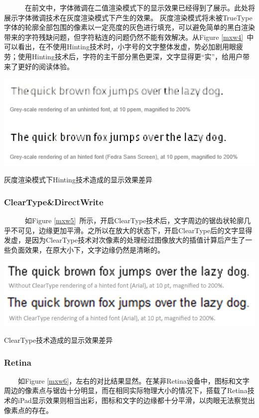 \documentclass[a4paper]{article}
\begin{document}
~~~~~~在前文中，字体微调在二值渲染模式下的显示效果已经得到了展示。此处将展示字体微调技术在灰度渲染模式下产生的效果。
灰度渲染模式将未被TrueType字体的轮廓全部包围的像素以一定亮度的灰色进行填充，可以避免简单的黑白渲染带来的字符残缺问题，但字符粘连的问题仍然不能有效解决。从Figure \ref{mxw4}~中可以看出，在不使用Hinting技术时，小字号的文字整体发虚，势必加剧用眼疲劳；使用Hinting技术后，字符的主干部分黑色更深，文字显得更“实”，给用户带来了更好的阅读体验。

\makeatletter
\def\@captype{figure}
\makeatother
\centerline{\includegraphics [width=1\textwidth]{mxw4.png} }
\caption{灰度渲染模式下Hinting技术造成的显示效果差异}
\label{mxw4}

\subsubsection{ClearType\&DirectWrite}

~~~~~~如Figure \ref{mxw5}~所示，开启ClearType技术后，文字周边的锯齿状轮廓几乎不可见，边缘更加平滑。之所以在放大的状态下，开启ClearType后的文字显得发虚，是因为ClearType技术对次像素的处理经过图像放大的插值计算后产生了一些负面效果，在原大小下，文字边缘仍然是清晰的。

\makeatletter
\def\@captype{figure}
\makeatother
\centerline{\includegraphics [width=1\textwidth]{mxw5.png} }
\caption{ ClearType技术造成的显示效果差异}
\label{mxw5}

\subsubsection{Retina}
~~~~如Figure \ref{mxw6}，左右的对比结果显然。在某非Retina设备中，图标和文字周边的像素点与锯齿十分明显，而在相同实际物理大小的情况下，搭载了Retina技术的iPad显示效果则相当出彩，图标和文字的边缘都十分平滑，以肉眼无法察觉出像素点的存在。
\end{document}

